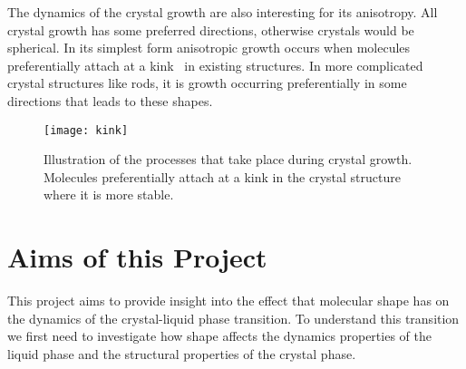 The dynamics of the crystal growth are also interesting for its anisotropy. All crystal growth has some preferred directions, otherwise crystals would be spherical. In its simplest form anisotropic growth occurs when molecules preferentially attach at a kink~ in existing structures. In more complicated crystal structures like rods, it is growth occurring preferentially in some directions that leads to these shapes.

\begin{figure}
    \centering
    \texttt{[image: kink]}
    \caption{Illustration of the processes that take place during crystal growth. Molecules preferentially attach at a kink in the crystal structure where it is more stable.}
    \label{fig:kink}
\end{figure}

\section{Aims of this Project}

This project aims to provide insight into the effect that molecular shape has on the dynamics of the crystal-liquid phase transition. To understand this transition we first need to investigate how shape affects the dynamics properties of the liquid phase and the structural properties of the crystal phase.
